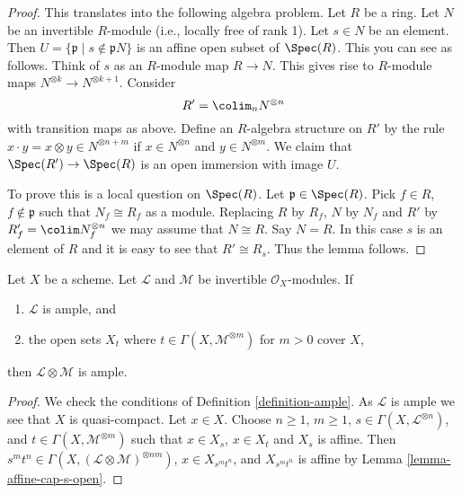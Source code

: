 \begin{proof}
This translates into the following algebra problem.
Let $R$ be a ring. Let $N$ be an invertible $R$-module
(i.e., locally free of rank 1). Let $s \in N$ be an element.
Then $U = \{\mathfrak p \mid s \not \in \mathfrak p N\}$ is
an affine open subset of $\Spec(R)$. This you can see
as follows. Think of $s$ as an $R$-module map $R \to N$.
This gives rise to $R$-module maps $N^{\otimes k} \to N^{\otimes k + 1}$.
Consider
$$
R' = \colim_n N^{\otimes n}
$$
with transition maps as above. Define an $R$-algebra structure on $R'$ by
the rule $x \cdot y = x \otimes y \in N^{\otimes n + m}$
if $x \in N^{\otimes n}$ and $y \in N^{\otimes m}$. We claim that
$\Spec(R') \to \Spec(R)$ is an open immersion with
image $U$.

\medskip\noindent
To prove this is a local question on $\Spec(R)$.
Let $\mathfrak p \in \Spec(R)$. Pick $f \in R$,
$f \not \in \mathfrak p$ such that $N_f \cong R_f$ as a module.
Replacing $R$ by $R_f$, $N$ by $N_f$ and $R'$ by
$R'_f = \colim N_f^{\otimes n}$ we may assume that $N \cong R$.
Say $N = R$. In this case $s$ is an element of $R$ and it is
easy to see that $R' \cong R_s$. Thus the lemma follows.
\end{proof}

\begin{lemma}
\label{lemma-ample-tensor-globally-generated}
Let $X$ be a scheme. Let $\mathcal{L}$ and $\mathcal{M}$
be invertible $\mathcal{O}_X$-modules. If
\begin{enumerate}
\item $\mathcal{L}$ is ample, and
\item the open sets $X_t$ where $t \in \Gamma(X, \mathcal{M}^{\otimes m})$
for $m > 0$ cover $X$,
\end{enumerate}
then $\mathcal{L} \otimes \mathcal{M}$ is ample.
\end{lemma}

\begin{proof}
We check the conditions of Definition \ref{definition-ample}.
As $\mathcal{L}$ is ample we see that $X$ is quasi-compact.
Let $x \in X$. Choose $n \geq 1$, $m \geq 1$,
$s \in \Gamma(X, \mathcal{L}^{\otimes n})$, and
$t \in \Gamma(X, \mathcal{M}^{\otimes m})$
such that $x \in X_s$, $x \in X_t$ and $X_s$ is affine.
Then $s^mt^n \in \Gamma(X, (\mathcal{L} \otimes \mathcal{M})^{\otimes nm})$,
$x \in X_{s^mt^n}$, and $X_{s^mt^n}$ is affine by
Lemma \ref{lemma-affine-cap-s-open}.
\end{proof}

